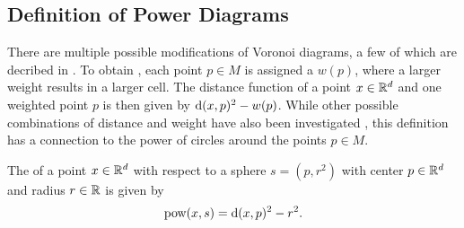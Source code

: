 \subsection{Definition of Power Diagrams}
\label{sub:definition_of_power_diagrams}
There are multiple possible modifications of Voronoi diagrams, a few of which are decribed in \cite{aurenhammer1987power}.
To obtain , each point $p \in M$ is assigned a  $w(p)$, where a larger weight results in a larger cell.
The distance function of a point $x \in \mathbb{R}^d$ and one weighted point $p$ is then given by $\operatorname{d}(x, p)^2 - w(p)$.
While other possible combinations of distance and weight have also been investigated \cite{aurenhammer1987power}, this definition has a connection to the power of circles around the points $p \in M$.

\begin{definition}
    \label{def:power}
    The  of a point $x \in \mathbb{R}^d$ with respect to a sphere $s = (p, r^2)$ with center $p \in \mathbb{R}^d$ and radius $r \in \mathbb{R}$ is given by
    \begin{align}
        \operatorname{pow}(x, s) = \operatorname{d}(x, p)^2 - r^2.
    \end{align}
\end{definition}
